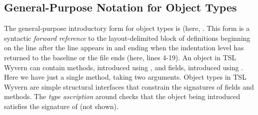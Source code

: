 \subsection{General-Purpose Notation for Object Types}
The general-purpose introductory form for object types is  (here, . This form is a syntactic \emph{forward reference} to the layout-delimited block of {definitions} beginning on the line after the line  appears in and ending when the indentation level has returned to the baseline or the file ends (here, lines 4-19). An object in TSL Wyvern can contain methods, introduced using , and fields, introduced using . Here we have just a single method,  taking two arguments. Object types in TSL Wyvern are simple structural interfaces that constrain the signatures of fields and methods. The \emph{type ascription} around  checks that the object being introduced satisfies the signature of  (not shown).
